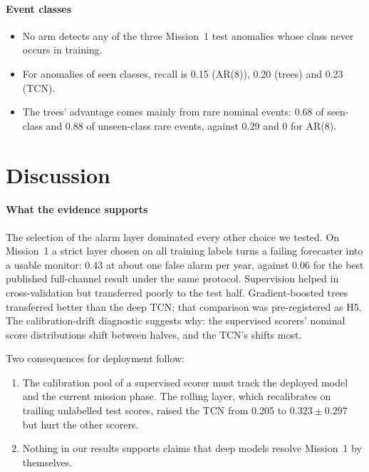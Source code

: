 \documentclass[preprint,12pt,authoryear]{elsarticle}
\begin{document}
\paragraph{Event classes}
\begin{itemize}
\item No arm detects any of the three Mission~1 test anomalies whose class never occurs in
  training.
\item For anomalies of seen classes, recall is 0.15 (AR(8)), 0.20 (trees) and 0.23 (TCN).
\item The trees' advantage comes mainly from rare nominal events: 0.68 of seen-class and
  0.88 of unseen-class rare events, against 0.29 and 0 for AR(8).
\end{itemize}

\section{Discussion}\label{sec:discussion}
\paragraph{What the evidence supports}
The selection of the alarm layer dominated every other choice we tested. On Mission~1 a
strict layer chosen on all training labels turns a failing forecaster into a usable monitor:
0.43 at about one false alarm per year, against 0.06 for the best published full-channel
result under the same protocol. Supervision helped in cross-validation but transferred
poorly to the test half. Gradient-boosted trees transferred better than the deep TCN; that
comparison was pre-registered as H5. The calibration-drift diagnostic suggests why: the
supervised scorers' nominal score distributions shift between halves, and the TCN's shifts
most.

Two consequences for deployment follow:
\begin{enumerate}
\item The calibration pool of a supervised scorer must track the deployed model and the
  current mission phase. The rolling layer, which recalibrates on trailing unlabelled test
  scores, raised the TCN from 0.205 to $0.323\pm0.297$ but hurt the other scorers.
\item Nothing in our results supports claims that deep models resolve Mission~1 by
  themselves.
\end{enumerate}
\end{document}
